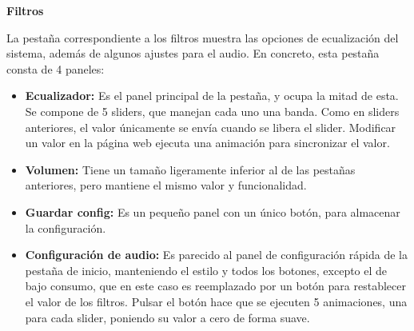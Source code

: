 \textbf{Filtros}

La pestaña correspondiente a los filtros muestra las opciones de ecualización del sistema, además de algunos ajustes para el audio. En concreto, esta pestaña consta de 4 paneles: 
\begin{itemize}
    \item \textbf{Ecualizador:} Es el panel principal de la pestaña, y ocupa la mitad de esta. Se compone de 5 sliders, que manejan cada uno una banda. Como en sliders anteriores, el valor únicamente se envía cuando se libera el slider. Modificar un valor en la página web ejecuta una animación para sincronizar el valor.
    \item \textbf{Volumen:} Tiene un tamaño ligeramente inferior al de las pestañas anteriores, pero mantiene el mismo valor y funcionalidad.
    \item \textbf{Guardar config:} Es un pequeño panel con un único botón, para almacenar la configuración.
    \item \textbf{Configuración de audio:} Es parecido al panel de configuración rápida de la pestaña de inicio, manteniendo el estilo y todos los botones, excepto el de bajo consumo, que en este caso es reemplazado por un botón para restablecer el valor de los filtros. Pulsar el botón hace que se ejecuten 5 animaciones, una para cada slider, poniendo su valor a cero de forma suave.
\end{itemize}
